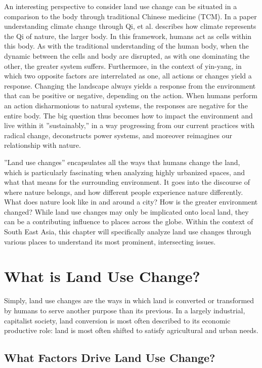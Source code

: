 \documentclass{book}\usepackage{knitr}
\begin{document}
An interesting perspective to consider land use change can be situated in a comparison to the body through traditional Chinese medicine (TCM). In a paper understanding climate change through Qi,  et al. describes how climate represents the Qi of nature, the larger body. In this framework, humans act as cells within this body. As with the traditional understanding of the human body, when the dynamic between the cells and body are disrupted, as with one dominating the other, the greater system suffers. Furthermore, in the context of yin-yang, in which two opposite factors are interrelated as one, all actions or changes yield a response. Changing the landscape always yields a response from the environment that can be positive or negative, depending on the action. When humans perform an action disharmonious to natural systems, the responses are negative for the entire body. The big question thus becomes how to impact the environment and live within it ''sustainably,'' in a way progressing from our current practices with radical change, deconstructs power systems, and moreover reimagines our relationship with nature.

''Land use changes'' encapsulates all the ways that humans change the land, which is particularly fascinating when analyzing highly urbanized spaces, and what that means for the surrounding environment. It goes into the discourse of where nature belongs, and how different people experience nature differently. What does nature look like in and around a city? How is the greater environment changed? While land use changes may only be implicated onto local land, they can be a contributing influence to places across the globe. Within the context of South East Asia, this chapter will specifically analyze land use changes through various places to understand its most prominent, intersecting issues.

\section{What is Land Use Change?}

Simply, land use changes are the ways in which land is converted or transformed by humans to serve another purpose than its previous. In a largely industrial, capitalist society, land conversion is most often described to its economic productive role: land is most often shifted to satisfy agricultural and urban needs. 

\subsection{What Factors Drive Land Use Change?}
\end{document}
